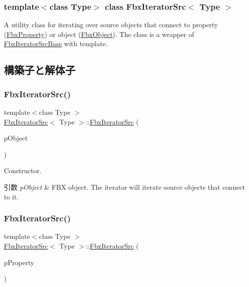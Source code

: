 \subsubsection*{template$<$class Type$>$\newline
class Fbx\+Iterator\+Src$<$ Type $>$}

A utility class for iterating over source objects that connect to property (\hyperlink{class_fbx_property}{Fbx\+Property}) or object (\hyperlink{class_fbx_object}{Fbx\+Object}). The class is a wrapper of \hyperlink{class_fbx_iterator_src_base}{Fbx\+Iterator\+Src\+Base} with template. 

\subsection{構築子と解体子}
\mbox{\label{class_fbx_iterator_src_ad3a24f4ca3fe6adc2178e694e0ecd316}} 
\subsubsection{\texorpdfstring{Fbx\+Iterator\+Src()}{FbxIteratorSrc()}\hspace{0.1cm}{\footnotesize\ttfamily [1/2]}}
{\footnotesize\ttfamily template$<$class Type $>$ \\
\hyperlink{class_fbx_iterator_src}{Fbx\+Iterator\+Src}$<$ Type $>$\+::\hyperlink{class_fbx_iterator_src}{Fbx\+Iterator\+Src} (\begin{DoxyParamCaption}\item[{\hyperlink{class_fbx_object}{Fbx\+Object} $\ast$}]{p\+Object }\end{DoxyParamCaption})}

Constructor. 
\begin{DoxyParams}{引数}
{\em p\+Object} & F\+BX object. The iterator will iterate source objects that connect to it. \\
\hline
\end{DoxyParams}
\mbox{\label{class_fbx_iterator_src_a5982990c1de3efa6145b49ffcf129d39}} 
\subsubsection{\texorpdfstring{Fbx\+Iterator\+Src()}{FbxIteratorSrc()}\hspace{0.1cm}{\footnotesize\ttfamily [2/2]}}
{\footnotesize\ttfamily template$<$class Type $>$ \\
\hyperlink{class_fbx_iterator_src}{Fbx\+Iterator\+Src}$<$ Type $>$\+::\hyperlink{class_fbx_iterator_src}{Fbx\+Iterator\+Src} (\begin{DoxyParamCaption}\item[{\hyperlink{class_fbx_property}{Fbx\+Property} \&}]{p\+Property }\end{DoxyParamCaption})}

